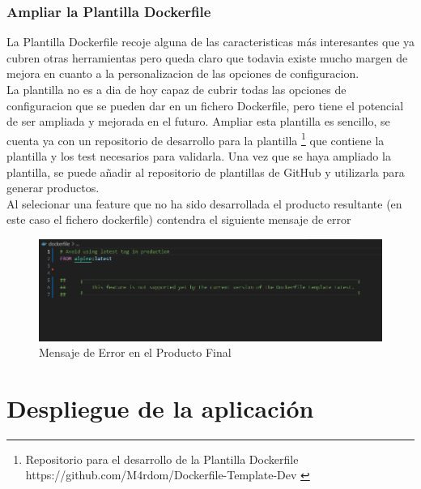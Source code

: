 \documentclass[12pt, a4paper, twoside]{article}
\begin{document}
\subsubsection{Ampliar la Plantilla Dockerfile}
La Plantilla Dockerfile recoje alguna de las caracteristicas más interesantes que ya cubren otras herramientas pero queda claro que todavia existe mucho margen de mejora en cuanto a la personalizacion de las opciones de configuracion.
\\La plantilla no es a dia de hoy capaz de cubrir todas las opciones de configuracion que se pueden dar en un fichero Dockerfile, pero tiene el potencial de ser ampliada y mejorada en el futuro.
Ampliar esta plantilla es sencillo, se cuenta ya con un repositorio de desarrollo para la plantilla \footnote{Repositorio para el desarrollo de la Plantilla Dockerfile https://github.com/M4rdom/Dockerfile-Template-Dev \cite{dockerfile_template_dev}} que contiene la plantilla y los test necesarios para validarla.
Una vez que se haya ampliado la plantilla, se puede añadir al repositorio de plantillas de GitHub y utilizarla para generar productos.
\\Al selecionar una feature que no ha sido desarrollada el producto resultante (en este caso el fichero dockerfile) contendra el siguiente mensaje de error

\begin{figure}[h]
	\centering
	  \includegraphics[width=1\textwidth]{unupportedfeature.png}
	\caption{Mensaje de Error en el Producto Final}
\end{figure}








\section{Despliegue de la aplicación }
\label{sec:Despliegue de la aplicación}
\end{document}
